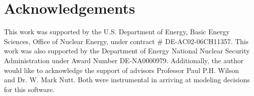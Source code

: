 \section{Acknowledgements}
This work was supported by the U.S.  Department of Energy, Basic Energy
Sciences, Office of Nuclear Energy, under contract \# DE-AC02-06CH11357.  This
work was also supported by the Department of Energy National Nuclear Security
Administration under Award Number DE‐NA0000979. Additionally, the author would
like to acknowledge the support of advisors Professor Paul P.H. Wilson and Dr.
W. Mark Nutt. Both were instrumental in arriving at modeling decisions for this
software.

